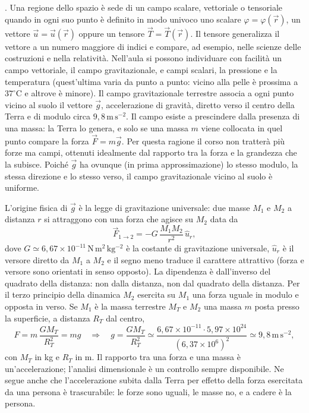 \documentclass[11pt,a4paper]{article}
\newcommand{\un}[1]{\,\mathrm{#1}}
\newcommand{\titoletto}[1]{\par\Needspace{4\baselineskip}\medskip\noindent{\large\scshape #1}\par\nopagebreak\smallskip\noindent}
\begin{document}
\titoletto{Campi scalari, vettoriali e tensoriali}. 
Una regione dello spazio è sede di un campo scalare, vettoriale o tensoriale quando in ogni suo punto è definito in modo univoco uno scalare $\varphi=\varphi(\vec r)$, un vettore $\vec u=\vec u(\vec r)$ oppure un tensore $\vec T=\vec T(\vec r)$. Il tensore generalizza il vettore a un numero maggiore di indici e compare, ad esempio, nelle scienze delle costruzioni e nella relatività. Nell'aula si possono individuare con facilità un campo vettoriale, il campo gravitazionale, e campi scalari, la pressione e la temperatura (quest'ultima varia da punto a punto: vicino alla pelle è prossima a $37^\circ\mathrm{C}$ e altrove è minore). Il campo gravitazionale terrestre associa a ogni punto vicino al suolo il vettore $\vec g$, accelerazione di gravità, diretto verso il centro della Terra e di modulo circa $9{,}8\un{m\,s^{-2}}$. Il campo esiste a prescindere dalla presenza di una massa: la Terra lo genera, e solo se una massa $m$ viene collocata in quel punto compare la forza $\vec F=m\vec g$. Per questa ragione il corso non tratterà più forze ma campi, ottenuti idealmente dal rapporto tra la forza e la grandezza che la subisce. Poiché $\vec g$ ha ovunque (in prima approssimazione) lo stesso modulo, la stessa direzione e lo stesso verso, il campo gravitazionale vicino al suolo è uniforme.

L'origine fisica di $\vec g$ è la legge di gravitazione universale: due masse $M_1$ e $M_2$ a distanza $r$ si attraggono con una forza che agisce su $M_2$ data da
\[
\vec F_{1\to2}=-G\,\frac{M_1M_2}{r^2}\,\hat u_r ,
\]
dove $G\simeq6{,}67\times10^{-11}\un{N\,m^2\,kg^{-2}}$ è la costante di gravitazione universale, $\hat u_r$ è il versore diretto da $M_1$ a $M_2$ e il segno meno traduce il carattere attrattivo (forza e versore sono orientati in senso opposto). La dipendenza è dall'inverso del quadrato della distanza: non dalla distanza, non dal quadrato della distanza. Per il terzo principio della dinamica $M_2$ esercita su $M_1$ una forza uguale in modulo e opposta in verso. Se $M_1$ è la massa terrestre $M_T$ e $M_2$ una massa $m$ posta presso la superficie, a distanza $R_T$ dal centro,
\[
F=m\,\frac{GM_T}{R_T^2}=mg\quad\Rightarrow\quad g=\frac{GM_T}{R_T^2}\simeq\frac{6{,}67\times10^{-11}\cdot5{,}97\times10^{24}}{(6{,}37\times10^{6})^2}\simeq9{,}8\un{m\,s^{-2}} ,
\]
con $M_T$ in kg e $R_T$ in m. Il rapporto tra una forza e una massa è un'accelerazione; l'analisi dimensionale è un controllo sempre disponibile. Ne segue anche che l'accelerazione subita dalla Terra per effetto della forza esercitata da una persona è trascurabile: le forze sono uguali, le masse no, e a cadere è la persona.
\end{document}

